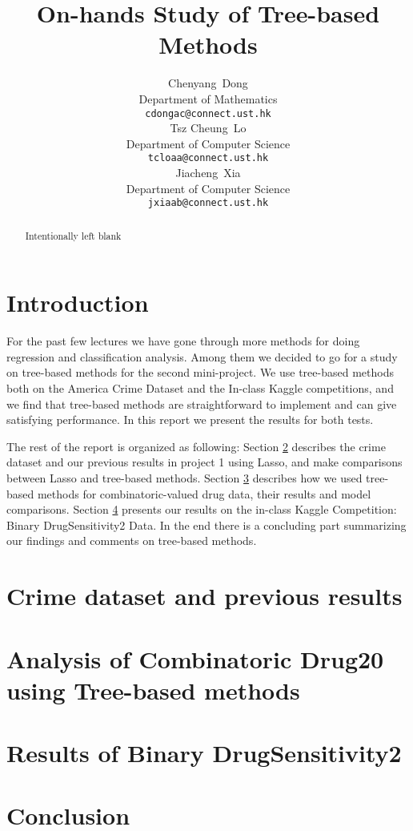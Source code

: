 \documentclass{article}
\title{On-hands Study of Tree-based Methods}
\author{
  Chenyang~Dong\\
  Department of Mathematics\\
  \texttt{cdongac@connect.ust.hk} \\
  \And
  Tsz Cheung~Lo\\
   Department of Computer Science\\
  \texttt{tcloaa@connect.ust.hk} \\
  \And
  Jiacheng~Xia\\
   Department of Computer Science\\
  \texttt{jxiaab@connect.ust.hk} \\
}
\begin{document}

\maketitle

\begin{abstract}
Intentionally left blank
\end{abstract}

\section{Introduction}
For the past few lectures we have gone through more methods for doing regression and classification analysis. Among them we decided to go for a study on tree-based methods for the second mini-project. We use tree-based methods both on the America Crime Dataset and the In-class Kaggle competitions, and we find that tree-based methods are straightforward to implement and can give satisfying performance. In this report we present the results for both tests.

The rest of the report is organized as following: Section \ref{crime-Lasso} describes the crime dataset and our previous results in project 1 using Lasso, and make comparisons between Lasso and tree-based methods. Section \ref{combodrug} describes how we used tree-based methods for combinatoric-valued drug data, their results and model comparisons. Section \ref{drug2} presents our results on the in-class Kaggle Competition: Binary DrugSensitivity2 Data. In the end there is a concluding part summarizing our findings and comments on tree-based methods.

\section{Crime dataset and previous results}
\label{crime-Lasso}

\section{Analysis of Combinatoric Drug20 using Tree-based methods}
\label{combodrug}

\section{Results of Binary DrugSensitivity2}
\label{drug2}

\section{Conclusion}
\label{con}
\end{document}
